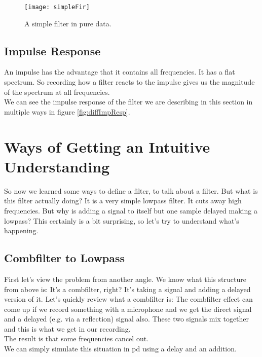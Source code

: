 \begin{figure}[H]
	\centering
	\texttt{[image: simpleFir]}
	\caption[FIR filter in pd]
	{A simple filter in pure data.}
	\label{fig:pdSimpleFir}
\end{figure}




\subsection{Impulse Response}

An impulse has the advantage that it contains all frequencies. It has a flat spectrum.  So recording how a filter reacts to the impulse gives us the magnitude of the spectrum at all frequencies.\\
We can see the impulse response of the filter we are describing in this section in  multiple ways in figure \ref{fig:diffImpResp}.


\section{Ways of Getting an Intuitive Understanding}

So now we learned some ways to define a filter, to talk about a filter. But what is this filter actually doing? It is a very simple lowpass filter. It cuts away high frequencies. But why is adding a signal to itself but one sample delayed making a lowpass? This certainly is a bit surprising, so let's try to understand what's happening.

\subsection{Combfilter to Lowpass}
First let's view the problem from another angle. We know what this structure from above is: It's a combfilter, right? It's taking a signal and adding a delayed version of it. Let's quickly review what a combfilter is:
The combfilter effect can come up if we record something with a microphone and we get the direct signal and a delayed (e.g. via a reflection) signal also. These two signals mix together and this is what we get in our recording.\\
The result is that some frequencies cancel out.\\
We can simply simulate this situation in pd using a delay and an addition.

